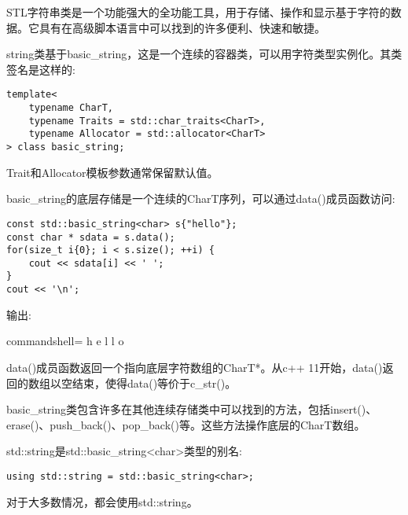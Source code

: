 STL字符串类是一个功能强大的全功能工具，用于存储、操作和显示基于字符的数据。它具有在高级脚本语言中可以找到的许多便利、快速和敏捷。

string类基于basic\_string，这是一个连续的容器类，可以用字符类型实例化。其类签名是这样的:

\begin{lstlisting}[style=styleCXX]
template<
	typename CharT,
	typename Traits = std::char_traits<CharT>,
	typename Allocator = std::allocator<CharT>
> class basic_string;
\end{lstlisting}

Trait和Allocator模板参数通常保留默认值。

basic\_string的底层存储是一个连续的CharT序列，可以通过data()成员函数访问:

\begin{lstlisting}[style=styleCXX]
const std::basic_string<char> s{"hello"};
const char * sdata = s.data();
for(size_t i{0}; i < s.size(); ++i) {
	cout << sdata[i] << ' ';
}
cout << '\n';
\end{lstlisting}

输出:

\begin{tcblisting}{commandshell={}}
h e l l o
\end{tcblisting}

data()成员函数返回一个指向底层字符数组的CharT*。从c++ 11开始，data()返回的数组以空结束，使得data()等价于c\_str()。

basic\_string类包含许多在其他连续存储类中可以找到的方法，包括insert()、erase()、push\_back()、pop\_back()等。这些方法操作底层的CharT数组。

std::string是std::basic\_string<char>类型的别名:

\begin{lstlisting}[style=styleCXX]
using std::string = std::basic_string<char>;
\end{lstlisting}

对于大多数情况，都会使用std::string。


